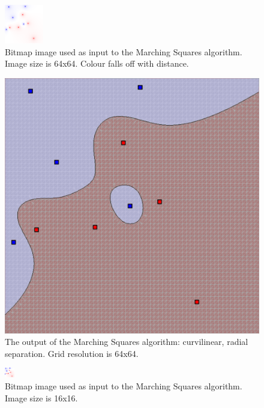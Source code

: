 \documentclass[12pt]{article}
\begin{document}
\begin{figure} 
\centering
  \includegraphics[width = 3 in]{64_res_image.png}
  \caption{Bitmap image used as input to the Marching Squares algorithm. 
Image size is 64x64.
Colour falls off with distance.
}
\end{figure}

\begin{figure} 
\centering
  \includegraphics[width = 3 in]{64_res.png}
  \caption{The output of the Marching Squares algorithm: curvilinear, radial separation. Grid resolution is 64x64.
}
\end{figure}


\begin{figure} 
\centering
  \includegraphics[width = 3 in]{16_res_image.png}
  \caption{Bitmap image used as input to the Marching Squares algorithm.
Image size is 16x16.
}
\end{figure}
\end{document}

